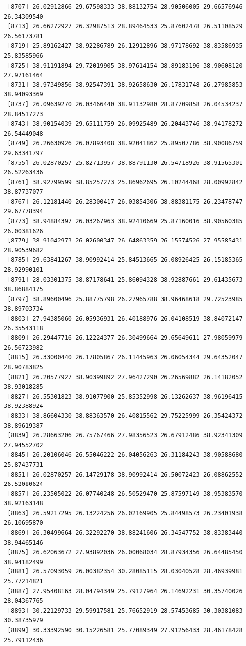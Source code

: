 \documentclass[
  letterpaper,
  DIV=11,
  numbers=noendperiod]{scrartcl}
\begin{document}
\begin{verbatim}
 [8707] 26.02912866 29.67598333 38.88132754 28.90506005 29.66576946 26.34309540
 [8713] 26.66272927 26.32987513 28.89464533 25.87602478 26.51108529 26.56173781
 [8719] 25.89162427 38.92286789 26.12912896 38.97178692 38.83586935 25.83585966
 [8725] 38.91191894 29.72019905 38.97614154 38.89183196 38.90608120 27.97161464
 [8731] 38.97349856 38.92547391 38.92658630 26.17831748 26.27985853 38.94093369
 [8737] 26.09639270 26.03466440 38.91132980 28.87709858 26.04534237 28.84517273
 [8743] 38.90154039 29.65111759 26.09925489 26.20443746 38.94178272 26.54449048
 [8749] 26.26630926 26.07893408 38.92041862 25.89507786 38.90086759 29.63341797
 [8755] 26.02870257 25.82713957 38.88791130 26.54718926 38.91565301 26.52263436
 [8761] 38.92799599 38.85257273 25.86962695 26.10244468 28.00992842 38.87737077
 [8767] 26.12181440 26.28300417 26.03854306 38.88381175 26.23478747 29.67778394
 [8773] 38.94884397 26.03267963 38.92410669 25.87160016 38.90560385 26.00381626
 [8779] 38.91042973 26.02600347 26.64863359 26.15574526 27.95585431 28.90539682
 [8785] 29.63841267 38.90992414 25.84513665 26.08926425 26.15185365 28.92990101
 [8791] 28.03301375 38.87178641 25.86094328 38.92887661 29.61435673 38.86884175
 [8797] 38.89600496 25.88775798 26.27965788 38.96468618 29.72523985 38.89703734
 [8803] 27.94385060 26.05936931 26.40188976 26.04108519 38.84072147 26.35543118
 [8809] 26.29447716 26.12224377 26.30499664 29.65649611 27.98059979 26.56723982
 [8815] 26.33000440 26.17805867 26.11445963 26.06054344 29.64352047 28.90783825
 [8821] 26.20577927 38.90399892 27.96427290 26.26569882 26.14182052 38.93018285
 [8827] 26.55301823 38.91077900 25.85352998 26.13262637 38.96196415 38.92388924
 [8833] 38.86604330 38.88363570 26.40815562 29.75225999 26.35424372 38.89619387
 [8839] 26.28663206 26.75767466 27.98356523 26.67912486 38.92341309 27.94552702
 [8845] 26.20106046 26.55046222 26.04056263 26.31184243 38.90588680 25.87437731
 [8851] 26.02870257 26.14729178 38.90992414 26.50072423 26.08862552 26.52080624
 [8857] 26.23505022 26.07740248 26.50529470 25.87597149 38.95383570 38.92163148
 [8863] 26.59217295 26.13224256 26.02169905 25.84498573 26.23401938 26.10695870
 [8869] 26.30499664 26.32292270 38.88241606 26.34547752 38.83383440 38.94465146
 [8875] 26.62063672 27.93892036 26.00068034 28.87934356 26.64485450 38.94182499
 [8881] 26.57093059 26.00382354 30.28085115 28.03040528 28.46939981 25.77214821
 [8887] 27.95408163 28.04794349 25.79127964 26.14692231 30.35740026 28.04367765
 [8893] 30.22129733 29.59917581 25.76652919 28.57453685 30.30381083 30.38735979
 [8899] 30.33392590 30.15226581 25.77089349 27.91256433 28.46178428 25.79112436

\end{verbatim}
\end{document}
